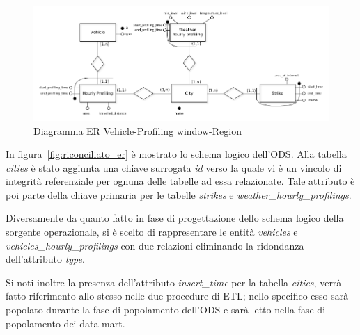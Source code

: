 \begin{figure}[H]                                                                                                                                                            
\centering                                                                                                                                                                   
\includegraphics[width=\textwidth]{diagrams/integrated_1_er}                                                                                                                                   
\caption{Diagramma ER Vehicle-Profiling window-Region}                                                                                                                                            
\label{fig:integrated_1_er}                                                                                                                                                           
\end{figure}

In figura~\ref{fig:riconciliato_er} è mostrato lo schema logico dell'ODS.
Alla tabella \textit{cities} è stato aggiunta una chiave surrogata \textit{id}
verso la quale vi è un vincolo di integrità referenziale per ognuna delle tabelle
ad essa relazionate. Tale attributo è poi parte della chiave primaria per le
tabelle \textit{strikes} e \textit{weather\_hourly\_profilings}.

Diversamente da quanto fatto in fase di progettazione dello schema logico della
sorgente operazionale, si è scelto di rappresentare le entità \textit{vehicles}
e \textit{vehicles\_hourly\_profilings} con due relazioni eliminando la
ridondanza dell'attributo \textit{type}. 

Si noti inoltre la presenza dell'attributo \textit{insert\_time} per la
tabella \textit{cities}, verrà fatto riferimento allo stesso nelle due procedure
di ETL; nello specifico esso sarà popolato durante la fase di popolamento
dell'ODS e sarà letto nella fase di popolamento dei data mart.


